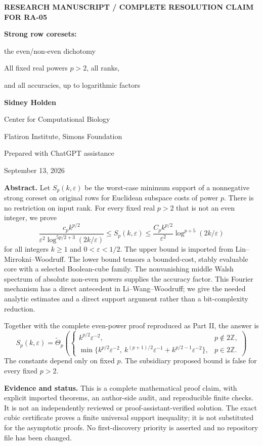 \documentclass[11pt]{article}
\theoremstyle{remark}\newtheorem{remark}[theorem]{Remark}
\newcommand{\eps}{\varepsilon}\newcommand{\norm}[1]{\left\|#1\right\|}
\begin{document}
\begin{titlepage}
{\small\bfseries RESEARCH MANUSCRIPT / COMPLETE RESOLUTION CLAIM FOR RA-05}\par\vspace{1cm}
{\huge\bfseries Strong row coresets:\par the even/non-even dichotomy}\par\vspace{.45cm}
{\Large All fixed real powers $p>2$, all ranks,\par and all accuracies, up to logarithmic factors}\par\vspace{.7cm}
\textbf{Sidney Holden}\par Center for Computational Biology\par Flatiron Institute, Simons Foundation\par Prepared with ChatGPT assistance\par
September 13, 2026\par\vspace{.6cm}
\textbf{Abstract.} Let $S_p(k,\eps)$ be the worst-case minimum support of a nonnegative strong coreset on original rows for Euclidean subspace costs of power $p$. There is no restriction on input rank. For every fixed real $p>2$ that is not an even integer, we prove
\[
 \frac{c_p k^{p/2}}{\eps^2\log^{5p/2+3}(2k/\eps)}
 \le S_p(k,\eps)
 \le \frac{C_p k^{p/2}}{\eps^2}\log^{p+5}(2k/\eps)
\]
for all integers $k\ge1$ and $0<\eps<1/2$. The upper bound is imported from Lin--Mirrokni--Woodruff. The lower bound tensors a bounded-cost, stably evaluable core with a selected Boolean-cube family. The nonvanishing middle Walsh spectrum of absolute non-even powers supplies the accuracy factor. This Fourier mechanism has a direct antecedent in Li--Wang--Woodruff; we give the needed analytic estimates and a direct support argument rather than a bit-complexity reduction.

Together with the complete even-power proof reproduced as Part II, the answer is
\[
 S_p(k,\eps)=\widetilde\Theta_p\!\left(
 \begin{cases}
 k^{p/2}\eps^{-2},&p\notin 2\mathbb Z,\\[1mm]
 \min\{k^{p/2}\eps^{-2},\ k^{(p+1)/2}\eps^{-1}
                  +k^{p/2-1}\eps^{-2}\},&p\in2\mathbb Z.
 \end{cases}\right)
\]
The constants depend only on fixed $p$. The subsidiary proposed bound is false for every fixed $p>2$.

\vfill
\textbf{Evidence and status.} This is a complete mathematical proof claim, with explicit imported theorems, an author-side audit, and reproducible finite checks. It is not an independently reviewed or proof-assistant-verified solution. The exact cubic certificate proves a finite universal support inequality; it is not substituted for the asymptotic proofs. No first-discovery priority is asserted and no repository file has been changed.
\end{titlepage}
\tableofcontents
\clearpage
\end{document}
